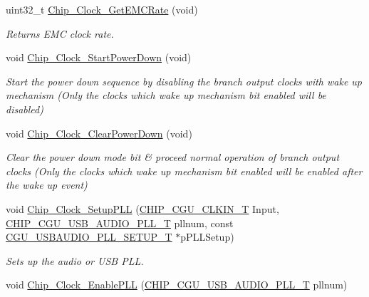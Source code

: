 \begin{DoxyCompactItemize}
uint32\+\_\+t \hyperlink{group___c_l_o_c_k__18_x_x__43_x_x_gaf8fefd2c98eee4d7954719d828a1cad8}{Chip\+\_\+\+Clock\+\_\+\+Get\+E\+M\+C\+Rate} (void)
\begin{DoxyCompactList}\small\item\em Returns E\+MC clock rate. \end{DoxyCompactList}\item 
void \hyperlink{group___c_l_o_c_k__18_x_x__43_x_x_ga4211f2f6083501edf23d418eb267b5aa}{Chip\+\_\+\+Clock\+\_\+\+Start\+Power\+Down} (void)
\begin{DoxyCompactList}\small\item\em Start the power down sequence by disabling the branch output clocks with wake up mechanism (Only the clocks which wake up mechanism bit enabled will be disabled) \end{DoxyCompactList}\item 
void \hyperlink{group___c_l_o_c_k__18_x_x__43_x_x_ga28a09f033418df7c8588b073af5d6eac}{Chip\+\_\+\+Clock\+\_\+\+Clear\+Power\+Down} (void)
\begin{DoxyCompactList}\small\item\em Clear the power down mode bit \& proceed normal operation of branch output clocks (Only the clocks which wake up mechanism bit enabled will be enabled after the wake up event) \end{DoxyCompactList}\item 
void \hyperlink{group___c_l_o_c_k__18_x_x__43_x_x_gaed16ed3df8281cb642db7525fdf1493d}{Chip\+\_\+\+Clock\+\_\+\+Setup\+P\+LL} (\hyperlink{group___c_l_o_c_k__18_x_x__43_x_x_ga0975326707efebf2b074283e6c602f18}{C\+H\+I\+P\+\_\+\+C\+G\+U\+\_\+\+C\+L\+K\+I\+N\+\_\+T} Input, \hyperlink{group___c_l_o_c_k__18_x_x__43_x_x_ga839a458a9e1e2a85e68470156c861e6a}{C\+H\+I\+P\+\_\+\+C\+G\+U\+\_\+\+U\+S\+B\+\_\+\+A\+U\+D\+I\+O\+\_\+\+P\+L\+L\+\_\+T} pllnum, const \hyperlink{struct_c_g_u___u_s_b_a_u_d_i_o___p_l_l___s_e_t_u_p___t}{C\+G\+U\+\_\+\+U\+S\+B\+A\+U\+D\+I\+O\+\_\+\+P\+L\+L\+\_\+\+S\+E\+T\+U\+P\+\_\+T} $\ast$p\+P\+L\+L\+Setup)
\begin{DoxyCompactList}\small\item\em Sets up the audio or U\+SB P\+LL. \end{DoxyCompactList}\item 
void \hyperlink{group___c_l_o_c_k__18_x_x__43_x_x_ga2715e421f23a820691b719126ebed2e0}{Chip\+\_\+\+Clock\+\_\+\+Enable\+P\+LL} (\hyperlink{group___c_l_o_c_k__18_x_x__43_x_x_ga839a458a9e1e2a85e68470156c861e6a}{C\+H\+I\+P\+\_\+\+C\+G\+U\+\_\+\+U\+S\+B\+\_\+\+A\+U\+D\+I\+O\+\_\+\+P\+L\+L\+\_\+T} pllnum)

\end{DoxyCompactItemize}
